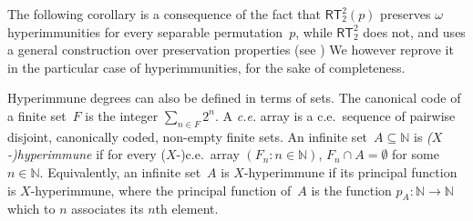 \documentclass{article}
\numberwithin{theorem}{section}
\newcommand{\RT}[0]{\mathsf{RT}}
\newcommand{\NN}[0]{\mathbb{N}}
\begin{document}
The following corollary is a consequence of the fact that $\RT^2_2(p)$ preserves $\omega$ hyperimmunities for every separable permutation~$p$, while $\RT^2_2$ does not, and uses a general construction over preservation properties (see \cite[Section 3.4, Lemma 3.4.2]{patey2016reverse}) We however reprove it in the particular case of hyperimmunities, for the sake of completeness.

Hyperimmune degrees can also be defined in terms of sets. The canonical code of a finite set~$F$ is the integer $\sum_{n \in F} 2^n$.
A \emph{c.e.} array is a c.e.\ sequence of pairwise disjoint, canonically coded, non-empty finite sets. An infinite set~$A \subseteq \NN$ is \emph{($X$-)hyperimmune} if for every ($X$-)c.e.\ array $(F_n : n \in \NN)$, $F_n \cap A = \emptyset$ for some~$n \in \NN$.
Equivalently, an infinite set~$A$ is $X$-hyperimmune if its principal function is $X$-hyperimmune, where the principal function of~$A$ is the function $p_A : \NN \to \NN$ which to $n$ associates its $n$th element.
\end{document}
